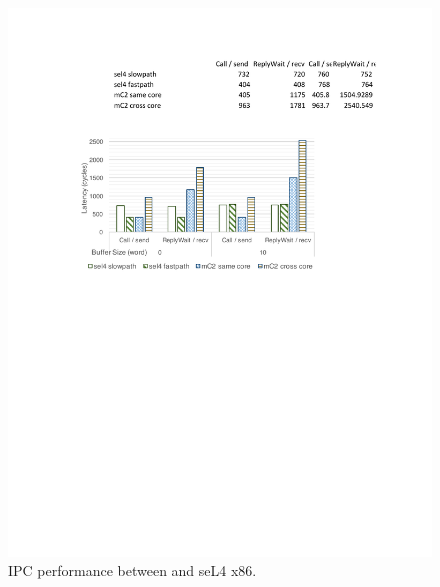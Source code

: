 \begin{figure}\centering
		\includegraphics[width=14cm]{figs/ipc.pdf}
		\caption{IPC performance between \cCTOS{} and  seL4 x86.}
		\label{fig:eval_ipc}
		\hrulefill
\end{figure}


